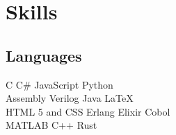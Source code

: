 \documentclass[]{deedy-resume-openfont}
\begin{document}
\begin{minipage}[t]{0.33\textwidth}




\section{Skills}
\subsection{Languages}
C \textbullet{}   C# \textbullet{} JavaScript \textbullet{} Python \\
Assembly\textbullet{} Verilog \textbullet{} Java \textbullet{} \LaTeX\ \\ 
HTML 5 and CSS \textbullet{} Erlang \textbullet{} Elixir \textbullet{} Cobol \textbullet{} \\
MATLAB   \textbullet{} C++ \textbullet{} Rust
\sectionsep


\end{minipage}
\end{document}
